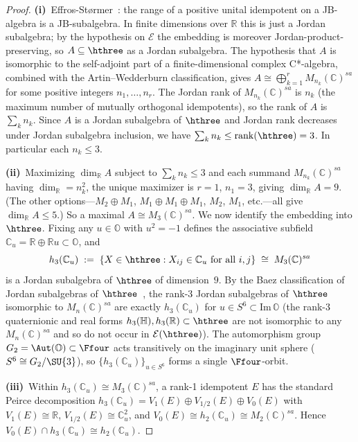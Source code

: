 \begin{proof}
\textbf{(i)}~Effros-St{\o}rmer~\cite{EffrosStormer1979}: the range
of a positive unital idempotent on a JB-algebra is a JB-subalgebra.
In finite dimensions over $\mathbb{R}$ this is just a Jordan
subalgebra; by the hypothesis on $\mathcal{E}$ the embedding is
moreover Jordan-product-preserving, so $A\subseteq\hthree$ as a
Jordan subalgebra.  The hypothesis that $A$ is isomorphic to the
self-adjoint part of a finite-dimensional complex C*-algebra,
combined with the Artin--Wedderburn classification, gives
$A\cong\bigoplus_{k=1}^{r} M_{n_k}(\mathbb{C})^{sa}$ for some
positive integers $n_1,\ldots,n_r$.  The Jordan rank of
$M_{n_k}(\mathbb{C})^{sa}$ is $n_k$ (the maximum number of
mutually orthogonal idempotents), so the rank of $A$ is
$\sum_k n_k$.  Since $A$ is a Jordan subalgebra of $\hthree$ and
Jordan rank decreases under Jordan subalgebra inclusion, we have
$\sum_k n_k\leq\mathrm{rank}(\hthree)=3$.  In particular each
$n_k\leq 3$.

\textbf{(ii)}~Maximizing $\dim_{\mathbb{R}} A$ subject to
$\sum_k n_k\leq 3$ and each summand $M_{n_k}(\mathbb{C})^{sa}$
having $\dim_{\mathbb{R}}=n_k^2$, the unique maximizer is
$r=1$, $n_1=3$, giving $\dim_{\mathbb{R}} A=9$.  (The other
options---$M_2\oplus M_1$, $M_1\oplus M_1\oplus M_1$, $M_2$, $M_1$,
etc.---all give $\dim_{\mathbb{R}} A\leq 5$.)  So a maximal
$A\cong M_3(\mathbb{C})^{sa}$.  We now identify the embedding into
$\hthree$.  Fixing any $u\in\mathbb{O}$ with $u^2=-1$ defines the
associative subfield $\mathbb{C}_u=\mathbb{R}\oplus\mathbb{R}u
\subset\mathbb{O}$, and
\[
  h_3(\mathbb{C}_u) \;:=\; \{X\in\hthree : X_{ij}\in\mathbb{C}_u
  \text{ for all } i,j\} \;\cong\; M_3(\mathbb{C})^{sa}
\]
is a Jordan subalgebra of $\hthree$ of dimension~$9$.  By the
Baez classification of Jordan subalgebras of
$\hthree$~\cite[\S 3.4 \& \S 4.4]{Baez2002}, the rank-3
Jordan subalgebras of $\hthree$ isomorphic to $M_n(\mathbb{C})^{sa}$
are exactly $h_3(\mathbb{C}_u)$ for $u\in S^6
\subset\mathrm{Im}\,\mathbb{O}$ (the rank-3 quaternionic and real
forms $h_3(\mathbb{H}),h_3(\mathbb{R})\subset\hthree$ are not
isomorphic to any $M_n(\mathbb{C})^{sa}$ and so do not occur in
$\mathcal{E}(\hthree)$).  The automorphism group
$G_2=\Aut(\mathbb{O})\subset\Ffour$ acts transitively on the
imaginary unit sphere ($S^6\cong G_2/\SU{3}$), so
$\{h_3(\mathbb{C}_u)\}_{u\in S^6}$ forms a single $\Ffour$-orbit.

\textbf{(iii)}~Within $h_3(\mathbb{C}_u)\cong M_3(\mathbb{C})^{sa}$,
a rank-1 idempotent $E$ has the standard Peirce decomposition
$h_3(\mathbb{C}_u) = V_1(E)\oplus V_{1/2}(E)\oplus V_0(E)$
with $V_1(E)\cong\mathbb{R}$, $V_{1/2}(E)\cong\mathbb{C}_u^2$,
and $V_0(E)\cong h_2(\mathbb{C}_u)\cong M_2(\mathbb{C})^{sa}$.
Hence $V_0(E)\cap h_3(\mathbb{C}_u)\cong h_2(\mathbb{C}_u)$.
\end{proof}

